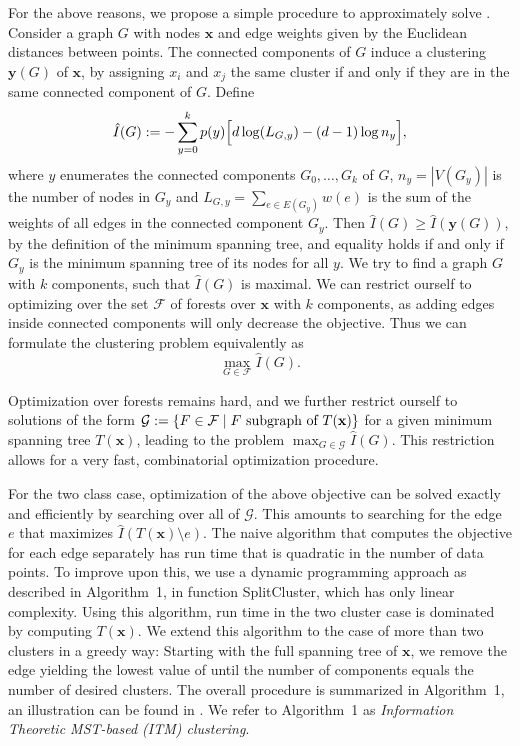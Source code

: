 For the above reasons, we propose a simple procedure to approximately solve
.
Consider a graph $G$ with nodes $\mathbf{x}$ and edge weights given by the
Euclidean distances between points.  The connected components of $G$ induce a
clustering $\mathbf{y}(G)$ of $\mathbf{x}$, by assigning $x_i$ and $x_j$ the
same cluster if and only if they are in the same connected component of $G$.
Define
\begin{align}\label{eq:graphobjective}
\hat{I}(G) := - \sum_{y=0}^k p(y) \Bigl[ d \log(L_{G,y}) - (d-1) \log{n_y} \Bigr],
\end{align}
where $y$ enumerates the connected components $G_0, \dotsc, G_k$ of $G$, $n_y =
|V(G_y)|$ is the number of nodes in $G_y$ and $L_{G,y} = \sum_{e \in E(G_y)}
w(e)$ is the sum of the weights of all edges in the connected component $G_y$.
%
Then $\hat{I}(G) \geq \hat{I}(\mathbf{y}(G))$, by the definition of
the minimum spanning tree, and equality holds if and only if $G_y$ is the
minimum spanning tree of its nodes for all $y$.
%
We try to find a graph $G$ with $k$ components, such that $\hat{I}(G)$ is maximal. We can restrict
ourself to optimizing over the set $\mathcal{F}$ of forests over $\mathbf{x}$ with $k$ components,
as adding edges inside connected components will only decrease the objective.
Thus we can formulate the clustering problem equivalently as
\begin{equation}
    \max_{G \in \mathcal{F}} \hat{I}(G).
\end{equation}


Optimization over forests remains hard, and we further restrict ourself to
solutions of the form $\mathcal{G} := \{ F \in \mathcal{F} \mid F \text{\ subgraph of\
} T(\mathbf{x}) \}$ for a given minimum spanning tree $T(\mathbf{x})$, leading to
the problem $\displaystyle \max_{G \in \mathcal{G}} \hat{I}(G)$.  This restriction allows for
a very fast, combinatorial optimization procedure.


For the two class case, optimization of the above objective can be solved
exactly and efficiently by searching over all of $\mathcal{G}$.
This amounts to searching for the edge $e$ that maximizes $\hat{I}(T(\mathbf{x})
\setminus e)$. The naive algorithm that computes the objective for each edge
separately has run time that is quadratic in the number of data points.  To
improve upon this, we use a dynamic programming approach as described in
Algorithm~1, in function SplitCluster, which has only linear
complexity. Using this algorithm, run time in the two cluster case is dominated
by computing $T(\mathbf{x})$.
%
We extend this algorithm to the case of more than two clusters in a greedy way:
Starting with the full spanning tree of $\mathbf{x}$, we remove the edge
yielding the lowest value of \Eqref{graphobjective} until the number of
components equals the number of desired clusters. The overall procedure is
summarized in Algorithm~1, an illustration can be found in
. We refer to Algorithm~1 as \emph{Information
Theoretic MST-based (ITM) clustering}.

